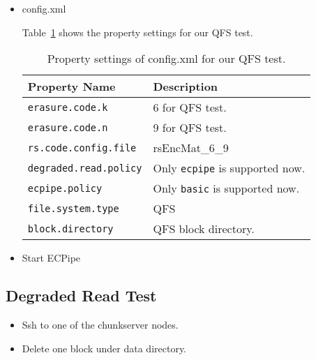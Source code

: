 \documentclass[letterpaper,12pt]{article}
\begin{document}
\begin{itemize}

\item config.xml

Table~\ref{tab:qfs_test} shows the property settings for our QFS test.

\begin{table}[!ht]
\centering
\renewcommand{\arraystretch}{1.1}
\small
\begin{tabular}{|l|l|}
\hline
{\bf Property Name} & {\bf Description} \\
\hline
{\tt erasure.code.k} & 6 for QFS test. \\
\hline
{\tt erasure.code.n} & 9 for QFS test. \\
\hline
{\tt rs.code.config.file} & rsEncMat\_6\_9 \\
\hline
{\tt degraded.read.policy} & Only {\tt ecpipe} is supported now. \\
\hline
{\tt ecpipe.policy} & Only {\tt basic} is supported now. \\
\hline
{\tt file.system.type} & QFS \\
\hline
{\tt block.directory} & QFS block directory. \\
\hline
\end{tabular}
\caption{Property settings of config.xml for our QFS test.}
\label{tab:qfs_test}
\end{table}

\item Start ECPipe

\begin{center}
\noindent{}
\end{center}

\end{itemize}

\subsection{Degraded Read Test}

\begin{itemize}
\item Ssh to one of the chunkserver nodes.
\item Delete one block under data directory.
\end{itemize}
\end{document}
